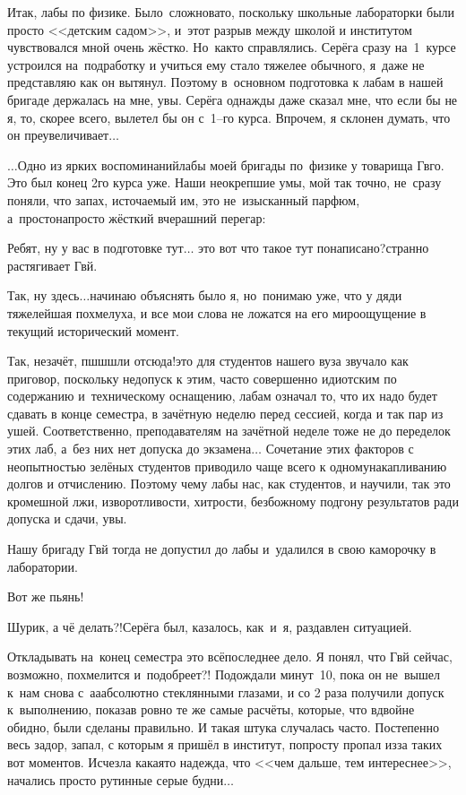 Итак, лабы по физике. Было~сложновато, поскольку школьные лабораторки были просто <<детским садом>>, и~этот разрыв между школой и институтом чувствовался мной очень жёстко. Но~как\sdash то справлялись. Серёга сразу на~1~курсе устроился на~подработку и учиться ему стало тяжелее обычного, я~даже не представляю как он вытянул. Поэтому в~основном подготовка к лабам в нашей бригаде держалась на мне, увы. Серёга однажды даже сказал мне, что если бы не я, то, скорее всего, вылетел бы он с~1\thinspace\nobreakdash--\sdash го курса. Впрочем, я склонен думать, что он преувеличивает$\ldots$ 

\vspace{1.0cm}
$\ldots$Одно из ярких воспоминаний\mdash лабы моей бригады по~физике у товарища Гв\sdash го. Это был конец 2\sdash го курса уже. Наши неокрепшие умы, мой так точно, не~сразу поняли, что запах, источаемый им, это не~изысканный парфюм, а~просто\sdash напросто жёсткий вчерашний перегар:

\diagdash Ребят, ну у вас в подготовке тут$\ldots$ это вот что такое тут понаписано?\mdash странно растягивает Гв\sdash й.

\diagdash Так, ну здесь$\ldots$\mdash начинаю объяснять было я, но~понимаю уже, что у дяди тяжелейшая похмелуха, и все мои слова не ложатся на его мироощущение в текущий исторический момент.

\diagdash Так, незачёт, пш\sdash ш\sdash шли отсюда!\mdash это для студентов нашего вуза звучало как приговор, поскольку недопуск к этим, часто совершенно идиотским по содержанию и~техническому оснащению, лабам означал то, что их надо будет сдавать в конце семестра, в зачётную неделю перед сессией, когда и так пар из ушей. Соответственно, преподавателям на зачётной неделе тоже не до переделок этих лаб, а~без них нет допуска до экзамена$\ldots$ Сочетание этих факторов с неопытностью зелёных студентов приводило чаще всего к одному\mdash накапливанию долгов и отчислению. Поэтому чему лабы нас, как студентов, и научили, так это кромешной лжи, изворотливости, хитрости, безбожному подгону результатов ради допуска и сдачи, увы.

Нашу бригаду Гв\sdash й тогда не допустил до лабы и~удалился в свою каморочку в лаборатории. 

\diagdash Вот же пьянь!

\diagdash Шурик, а чё делать?!\mdash Серёга был, казалось, как~и~я, раздавлен ситуацией.

Откладывать на~конец семестра это всё\mdash последнее дело. Я понял, что Гв\sdash й сейчас, возможно, похмелится и~подобреет?! Подождали минут~10, пока он не~вышел к~нам снова с~а\sdash а\sdash абсолютно стеклянными глазами, и со 2 раза получили допуск к~выполнению, показав ровно те же самые расчёты, которые, что вдвойне обидно, были сделаны правильно. И такая штука случалась часто. Постепенно весь задор, запал, с которым я пришёл в институт, попросту пропал из\sdash за таких вот моментов. Исчезла какая\sdash то надежда, что <<чем дальше, тем интереснее>>, начались просто рутинные серые будни$\ldots$

